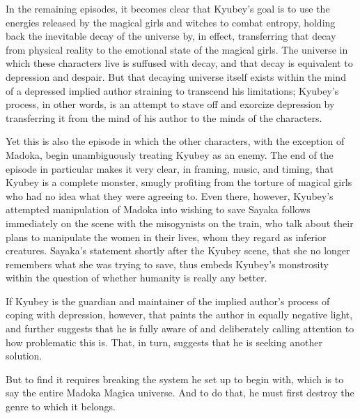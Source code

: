 In the remaining episodes, it becomes clear that Kyubey's goal is to use the energies released by the magical girls and witches to combat entropy, holding back the inevitable decay of the universe by, in effect, transferring that decay from physical reality to the emotional state of the magical girls. The universe in which these characters live is suffused with decay, and that decay is equivalent to depression and despair. But that decaying universe itself exists within the mind of a depressed implied author straining to transcend his limitations; Kyubey's process, in other words, is an attempt to stave off and exorcize depression by transferring it from the mind of his author to the minds of the characters.

Yet this is also the episode in which the other characters, with the exception of Madoka, begin unambiguously treating Kyubey as an enemy. The end of the episode in particular makes it very clear, in framing, music, and timing, that Kyubey is a complete monster, smugly profiting from the torture of magical girls who had no idea what they were agreeing to. Even there, however, Kyubey's attempted manipulation of Madoka into wishing to save Sayaka follows immediately on the scene with the misogynists on the train, who talk about their plans to manipulate the women in their lives, whom they regard as inferior creatures. Sayaka's statement shortly after the Kyubey scene, that she no longer remembers what she was trying to save, thus embeds Kyubey's monstrosity within the question of whether humanity is really any better. 

If Kyubey is the guardian and maintainer of the implied author's process of coping with depression, however, that paints the author in equally negative light, and further suggests that he is fully aware of and deliberately calling attention to how problematic this is. That, in turn, suggests that he is seeking another solution.

But to find it requires breaking the system he set up to begin with, which is to say the entire Madoka Magica universe. And to do that, he must first destroy the genre to which it belongs.
